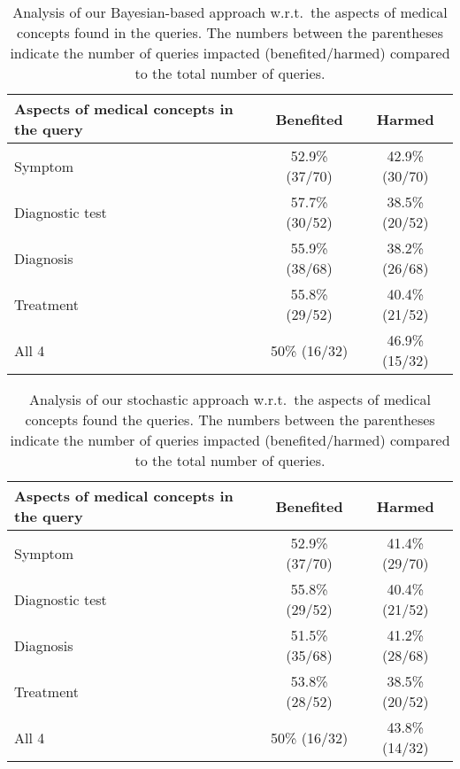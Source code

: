 \documentclass[1p]{elsarticle}
\begin{document}


\begin{table}[tb]
\caption{Analysis of our Bayesian-based approach w.r.t.\ the aspects of medical concepts found in the queries. The numbers between the parentheses indicate the number of queries impacted (benefited/harmed) compared to the total number of queries.}\label{tab:c7:analysis-bayesian}
  \centering
\begin{tabular}{|l|c|c|}
    \hline
    Aspects of medical concepts in the query & Benefited & Harmed \\ \hline
    Symptom & 52.9\% (37/70)& 42.9\%(30/70) \\
    Diagnostic test & 57.7\% (30/52) & 38.5\%(20/52)\\
    Diagnosis & 55.9\% (38/68) & 38.2\% (26/68)\\
    Treatment & 55.8\% (29/52) & 40.4\% (21/52)\\
    All 4 & 50\% (16/32) & 46.9\%(15/32) \\
    \hline
  \end{tabular}
\end{table}

\begin{table}[tb]
\caption{Analysis of our stochastic approach w.r.t.\ the aspects of medical concepts found the queries. The numbers between the parentheses indicate the number of queries impacted (benefited/harmed) compared to the total number of queries.}\label{tab:c7:analysis-salsa}
  \centering
  \small
\begin{tabular}{|l|c|c|}
    \hline
    Aspects of medical concepts in the query & Benefited & Harmed \\ \hline
    Symptom & 52.9\% (37/70)& 41.4\%(29/70) \\
    Diagnostic test & 55.8\% (29/52) & 40.4\%(21/52)\\
    Diagnosis & 51.5\% (35/68) & 41.2\% (28/68)\\
    Treatment & 53.8\% (28/52) & 38.5\% (20/52)\\
    All 4 & 50\% (16/32) & 43.8\%(14/32) \\
    \hline
  \end{tabular}
\end{table}
\end{document}
